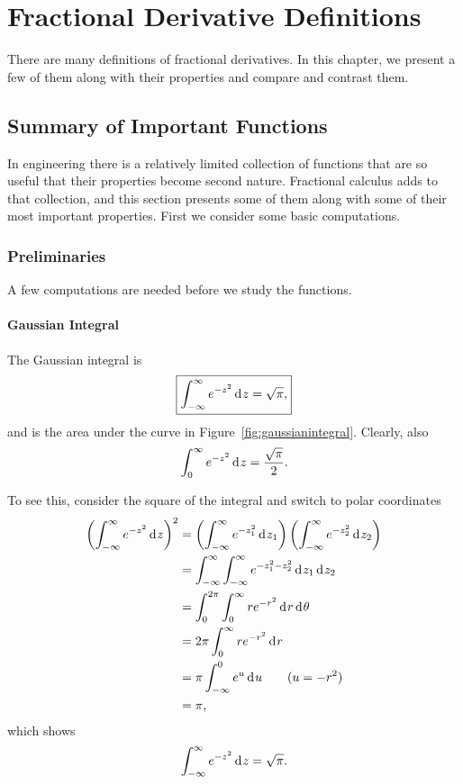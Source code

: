 \chapter{Fractional Derivative Definitions}

There are many definitions of fractional derivatives. In this chapter, we present a few of them along with their properties and compare and contrast them.
\section{Summary of Important Functions}

In engineering there is a relatively limited collection of functions that are so useful that their properties become second nature. Fractional calculus adds to that collection, and this section presents some of them along with some of their most important properties. First we consider some basic computations.

\subsection{Preliminaries}

A few computations are needed before we study the functions. 

\subsubsection{Gaussian Integral}
The Gaussian integral is
\begin{equation}
  \boxed {\int_{-\infty}^\infty e^{-z^2} \operatorname{d}\hspace*{-1pt} z = \sqrt{\pi}, }
  \label{eq:gaussianintegral}
\end{equation}
and is the area under the curve in Figure~\ref{fig:gaussianintegral}. Clearly, also
\begin{equation*}
  \int_0^\infty e^{-z^2} \operatorname{d}\hspace*{-1pt} z = \frac{\sqrt{\pi}}{2}.
\end{equation*}

To see this, consider the square of the integral and switch to polar coordinates
\begin{align*}
  \left( \int_{-\infty}^\infty e^{-z^2} \operatorname{d}\hspace*{-1pt} z \right)^2 &= \left( \int_{-\infty}^\infty e^{-z_1^2} \operatorname{d}\hspace*{-1pt} z_1 \right) \left( \int_{-\infty}^\infty e^{-z_2^2} \operatorname{d}\hspace*{-1pt} z_2 \right) \\
  &= \int_{-\infty}^{\infty} \int_{-\infty}^{\infty} e^{-z_1^2 - z_2^2} \operatorname{d}\hspace*{-1pt} z_1 \operatorname{d}\hspace*{-1pt} z_2 \\
  &= \int_0^{2 \pi} \int_0^\infty r e^{-r^2} \operatorname{d}\hspace*{-1pt} r \operatorname{d}\hspace*{-1pt} \theta \\
  &= 2 \pi \int_0^\infty r e^{-r^2} \operatorname{d}\hspace*{-1pt} r \\
  &= \pi \int_{-\infty}^0 e^u \operatorname{d}\hspace*{-1pt} u \qquad (u = -r^2) \\
  &= \pi,
\end{align*}
which shows
\begin{equation*}
  \int_{-\infty}^{\infty} e^{-z^2} \operatorname{d}\hspace*{-1pt} z = \sqrt{\pi}.
\end{equation*}


